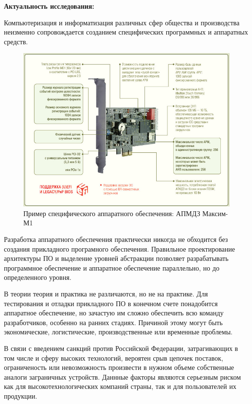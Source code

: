 \textbf{Актуальность исследования:}

Компьютеризация и информатизация различных сфер общества и производства неизменно
сопровождается созданием специфических программных и аппаратных средств.

\begin{figure}[!htbp]
    \includegraphics[width=\textwidth,height=\textheight,keepaspectratio]{images/apmdz.png}
    \caption{Пример специфического аппаратного обеспечения: АПМДЗ Максим-М1\label{fig:apmdz}}
\end{figure}

Разработка аппаратного обеспечения практически никогда не обходится без создания
прикладного програмного обеспечения.
Правильное проектирование архитектуры ПО и выделение уровней абстракции позволяет
разрабатывать программное обеспечение и аппаратное обеспечение параллельно, но
до определенного уровня.

В теории теория и практика не различаются, но не на практике.
Для тестирования и отладки прикладного ПО в конечном счете понадобится аппаратное обеспечение,
но зачастую им сложно обеспечить всю команду разработчиков, особенно на ранних стадиях.
Причиной этому могут быть экономические, логистические, производственные или временные проблемы.

В связи с введением санкций против Российской Федерации, затрагивающих
в том числе и сферу высоких технологий, вероятен срыв цепочек поставок,
ограниченость или невозможность произвести в нужном объеме собственные
аналоги заграничных устройств.
Даннные факторы являются серьезным риском как для высокотехнологических
компаний страны, так и для пользователей их продукции.

